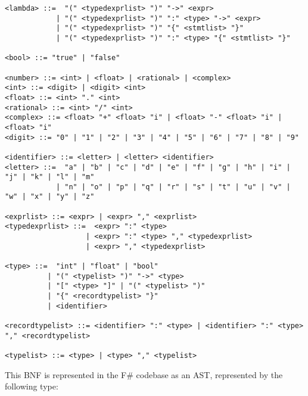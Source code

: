 \begin{verbatim}
<lambda> ::=  "(" <typedexprlist> ")" "->" <expr>
            | "(" <typedexprlist> ")" ":" <type> "->" <expr>
            | "(" <typedexprlist> ")" "{" <stmtlist> "}"
            | "(" <typedexprlist> ")" ":" <type> "{" <stmtlist> "}"

<bool> ::= "true" | "false"

<number> ::= <int> | <float> | <rational> | <complex>
<int> ::= <digit> | <digit> <int>
<float> ::= <int> "." <int>
<rational> ::= <int> "/" <int>
<complex> ::= <float> "+" <float> "i" | <float> "-" <float> "i" | <float> "i"
<digit> ::= "0" | "1" | "2" | "3" | "4" | "5" | "6" | "7" | "8" | "9"

<identifier> ::= <letter> | <letter> <identifier>
<letter> ::=  "a" | "b" | "c" | "d" | "e" | "f" | "g" | "h" | "i" | "j" | "k" | "l" | "m" 
            | "n" | "o" | "p" | "q" | "r" | "s" | "t" | "u" | "v" | "w" | "x" | "y" | "z"

<exprlist> ::= <expr> | <expr> "," <exprlist>
<typedexprlist> ::=  <expr> ":" <type> 
                   | <expr> ":" <type> "," <typedexprlist>
                   | <expr> "," <typedexprlist>

<type> ::=  "int" | "float" | "bool" 
          | "(" <typelist> ")" "->" <type> 
          | "[" <type> "]" | "(" <typelist> ")"
          | "{" <recordtypelist> "}"
          | <identifier>

<recordtypelist> ::= <identifier> ":" <type> | <identifier> ":" <type> "," <recordtypelist>

<typelist> ::= <type> | <type> "," <typelist>
\end{verbatim}

This BNF is represented in the F\# codebase as an AST, represented by the following type:

